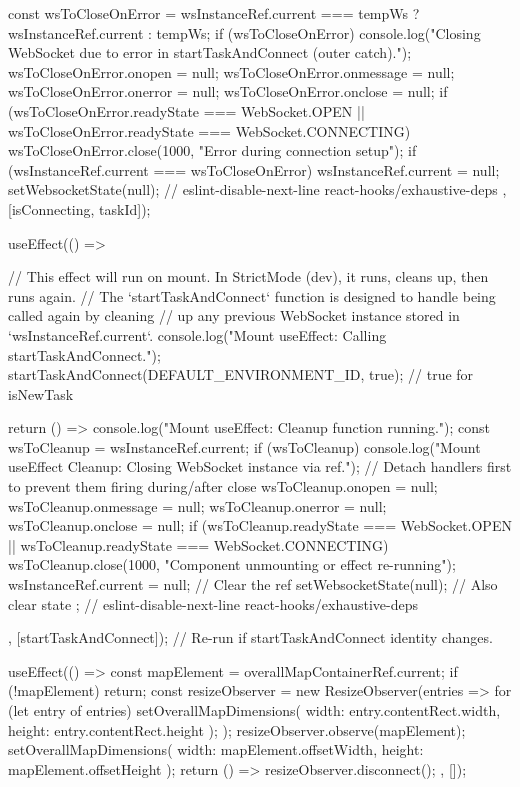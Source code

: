 {{{      const wsToCloseOnError = wsInstanceRef.current === tempWs ? wsInstanceRef.current : tempWs;
      if (wsToCloseOnError) {
        console.log("Closing WebSocket due to error in startTaskAndConnect (outer catch).");
        wsToCloseOnError.onopen = null; wsToCloseOnError.onmessage = null;
        wsToCloseOnError.onerror = null; wsToCloseOnError.onclose = null;
        if (wsToCloseOnError.readyState === WebSocket.OPEN || wsToCloseOnError.readyState === WebSocket.CONNECTING) {
            wsToCloseOnError.close(1000, "Error during connection setup");
        }
      }
      if (wsInstanceRef.current === wsToCloseOnError) wsInstanceRef.current = null;
      setWebsocketState(null);
    }
  // eslint-disable-next-line react-hooks/exhaustive-deps
  }, [isConnecting, taskId]);

  useEffect(() => {
    // This effect will run on mount. In StrictMode (dev), it runs, cleans up, then runs again.
    // The `startTaskAndConnect` function is designed to handle being called again by cleaning
    // up any previous WebSocket instance stored in `wsInstanceRef.current`.
    console.log("Mount useEffect: Calling startTaskAndConnect.");
    startTaskAndConnect(DEFAULT_ENVIRONMENT_ID, true); // true for isNewTask

    return () => {
      console.log("Mount useEffect: Cleanup function running.");
      const wsToCleanup = wsInstanceRef.current;
      if (wsToCleanup) {
        console.log("Mount useEffect Cleanup: Closing WebSocket instance via ref.");
        // Detach handlers first to prevent them firing during/after close
        wsToCleanup.onopen = null;
        wsToCleanup.onmessage = null;
        wsToCleanup.onerror = null;
        wsToCleanup.onclose = null; 
        if (wsToCleanup.readyState === WebSocket.OPEN || wsToCleanup.readyState === WebSocket.CONNECTING) {
            wsToCleanup.close(1000, "Component unmounting or effect re-running");
        }
        wsInstanceRef.current = null; // Clear the ref
      }
      setWebsocketState(null); // Also clear state
    };
  // eslint-disable-next-line react-hooks/exhaustive-deps
  }, [startTaskAndConnect]); // Re-run if startTaskAndConnect identity changes.

  useEffect(() => {
    const mapElement = overallMapContainerRef.current;
    if (!mapElement) return;
    const resizeObserver = new ResizeObserver(entries => {
      for (let entry of entries) { setOverallMapDimensions({ width: entry.contentRect.width, height: entry.contentRect.height }); }
    });
    resizeObserver.observe(mapElement);
    setOverallMapDimensions({ width: mapElement.offsetWidth, height: mapElement.offsetHeight });
    return () => resizeObserver.disconnect();
  }, []);

}
